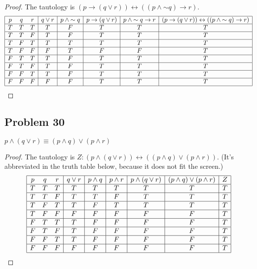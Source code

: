 \documentclass[14pt]{extarticle}
\newcommand{\bic}{\leftrightarrow}
\begin{document}
\begin{proof}
The tautology is $(p \to (q \vee r)) \bic ((p \wedge {\sim q}) \to r)$.
$$
\begin{array}{|ccc|c|c|c|c|c|c|}
\hline
p & q & r & q \vee r & p \wedge {\sim q} & p \to (q \vee r) & p \wedge {\sim q}
\to r & (p \to (q \vee r)) \bic ((p \wedge {\sim q}) \to r) \\
\hline
T & T & T & T & F & T & T & T \\
\hline
T & T & F & T & F & T & T & T \\
\hline
T & F & T & T & T & T & T & T \\
\hline
T & F & F & F & T & F & F & T \\
\hline
F & T & T & T & F & T & T & T \\
\hline
F & T & F & T & F & T & T & T \\
\hline
F & F & T & T & F & T & T & T \\
\hline
F & F & F & F & F & T & T & T \\
\hline
\end{array}
$$
\end{proof}

\subsection{Problem 30}
$p \wedge (q \vee r) \equiv (p \wedge q) \vee (p \wedge r)$

\begin{proof}
The tautology is $Z: (p \wedge (q \vee r)) \bic ((p \wedge q) \vee (p \wedge
r))$. (It's abbreviated in the truth table below, because it does not fit the
screen.)
$$
\begin{array}{|ccc|c|c|c|c|c|c|}
\hline
p & q & r & q \vee r & p \wedge q & p \wedge r & p \wedge (q \vee r) & (p \wedge
q) \vee (p \wedge r) & Z \\
\hline
T & T & T & T & T & T & T & T & T \\
\hline
T & T & F & T & T & F & T & T & T \\
\hline
T & F & T & T & F & T & T & T & T \\
\hline
T & F & F & F & F & F & F & F & T \\
\hline
F & T & T & T & F & F & F & F & T \\
\hline
F & T & F & T & F & F & F & F & T \\
\hline
F & F & T & T & F & F & F & F & T \\
\hline
F & F & F & F & F & F & F & F & T \\
\hline
\end{array}
$$
\end{proof}
\end{document}
